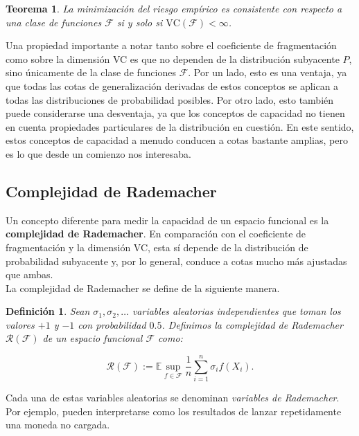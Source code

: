 \documentclass{article}
\newtheorem{thm}{Teorema}[subsection]
\newtheorem{dfn}{Definición}[subsection]
\begin{document}
\begin{thm}
    La minimización del riesgo empírico es consistente con respecto a una clase de funciones \(\mathcal{F}\) si y solo si
    \(\text{VC}(\mathcal{F}) < \infty\).\\ 
\end{thm}

Una propiedad importante a notar tanto sobre el coeficiente de fragmentación como sobre la 
dimensión VC es que no dependen de la distribución subyacente \( P \), sino únicamente de la 
clase de funciones \(\mathcal{F}\). Por un lado, esto es una ventaja, ya que todas las cotas de 
generalización derivadas de estos conceptos se aplican a todas las distribuciones de probabilidad 
posibles. Por otro lado, esto también puede considerarse una desventaja, ya que los conceptos de 
capacidad no tienen en cuenta propiedades particulares de la distribución en cuestión. En este 
sentido, estos conceptos de capacidad a menudo conducen a cotas bastante amplias, pero es lo que desde
un comienzo nos interesaba.\\

\subsection{Complejidad de Rademacher}
Un concepto diferente para medir la capacidad de un espacio funcional es la \textbf{complejidad de Rademacher}. 
En comparación con el coeficiente de fragmentación y la dimensión VC, esta sí depende de la distribución de 
probabilidad subyacente y, por lo general, conduce a cotas mucho más ajustadas que ambas. \\

La complejidad de Rademacher se define de la siguiente manera.

\begin{dfn}
Sean \(\sigma_1, \sigma_2, \dots\) variables aleatorias independientes que toman los valores \(+1\) y \(-1\) 
con probabilidad \(0.5\). Definimos la complejidad de Rademacher \(\mathscr{R}(\mathcal{F})\) de un espacio funcional 
\(\mathcal{F}\) como:

\[
    \mathscr{R}(\mathcal{F}) := \mathbb{E} \sup_{f \in \mathcal{F}} \frac{1}{n} \sum_{i=1}^{n} \sigma_i f(X_i).
\]
\end{dfn}

Cada una de estas variables aleatorias se denominan \textit{variables de Rademacher}. 
Por ejemplo, pueden interpretarse como los resultados de lanzar repetidamente una moneda no cargada. 
\end{document}
